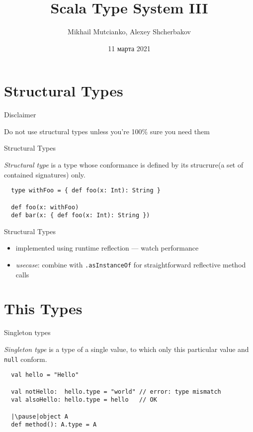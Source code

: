\documentclass[aspectratio=169]{beamer}
\title{Scala Type System III}
\author{Mikhail Mutcianko, Alexey Shcherbakov}
\institute{СПБгУ, СП}
\date{11 марта 2021}
\begin{document}
\frame{\titlepage}

\section{Structural Types}

\begin{frame}{Disclaimer}
  \begin{center}
    \LARGE \alert{Do not} use structural types unless you're 100\% sure you need them
  \end{center}
\end{frame}

\begin{frame}[fragile]{Structural Types}
  \begin{block}{}
    \textit{Structural type} is a type whose conformance is defined by its strucrure(a set of
    contained signatures) only. 
  \end{block}
  \bigskip
  \pause
  \begin{verbatim}
  type withFoo = { def foo(x: Int): String }

  def foo(x: withFoo)
  def bar(x: { def foo(x: Int): String })
  \end{verbatim}
\end{frame}

\begin{frame}{Structural Types}
  \begin{itemize}
    \item implemented using runtime reflection --- watch performance
    \item \textit{usecase}: combine with \texttt{.asInstanceOf} for straightforward reflective method
      calls
  \end{itemize}
\end{frame}

\section{This Types}
\begin{frame}[fragile]{Singleton types}
  \begin{block}{}
    \textit{Singleton type} is a type of a single value, to which only this particular value and
    \texttt{null} conform.
  \end{block}
  \pause
  \begin{verbatim}
  val hello = "Hello"
  
  val notHello:  hello.type = "world" // error: type mismatch
  val alsoHello: hello.type = hello   // OK

  |\pause|object A
  def method(): A.type = A
  \end{verbatim}
\end{frame}
\end{document}
